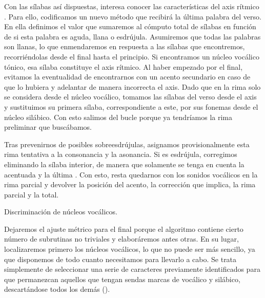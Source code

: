 Con las sílabas así dispuestas, interesa conocer las características del axis rítmico \parencite[38-60]{balbin1968}. Para ello, codificamos un nuevo método que recibirá la última palabra del verso. En ella definimos el valor que sumaremos al cómputo total de sílabas en función de si esta palabra es aguda, llana o esdrújula. Asumiremos que todas las palabras son llanas, lo que enmendaremos en respuesta a las sílabas que encontremos, recorriéndolas desde el final hasta el principio. Si encontramos un núcleo vocálico tónico, esa sílaba constituye el axis rítmico. Al haber empezado por el final, evitamos la eventualidad de encontrarnos con un acento secundario en caso de que lo hubiera y adelantar de manera incorrecta el axis. Dado que en la rima solo se considera desde el núcleo vocálico, tomamos las sílabas del verso desde el axis y sustituimos su primera sílaba, correspondiente a este, por sus fonemas desde el núcleo silábico. Con esto salimos del bucle porque ya tendríamos la rima preliminar que buscábamos.

Tras prevenirnos de posibles sobreesdrújulas, asignamos provisionalmente esta rima tentativa a la consonancia y la asonancia. Si es esdrújula, corregimos eliminando la sílaba interior, de manera que solamente se tenga en cuenta la acentuada y la última \parencite[60-65]{dominguez2014a}. Con esto, resta quedarnos con los sonidos vocálicos en la rima parcial y devolver la posición del acento, la corrección que implica, la rima parcial y la total.

\begin{algorithm}[!ht]
	\caption{Discriminación de núcleos vocálicos.}\label{list:VerSeMetre20}
\end{algorithm}

Dejaremos el ajuste métrico para el final porque el algoritmo contiene cierto número de subrutinas no triviales y elaboráremos antes otras. En su lugar, localizaremos primero los núcleos vocálicos, lo que no puede ser más sencillo, ya que disponemos de todo cuanto necesitamos para llevarlo a cabo. Se trata simplemente de seleccionar una serie de caracteres previamente identificados para que permanezcan aquellos que tengan sendas marcas de vocálico y silábico, descartándose todos los demás ().


